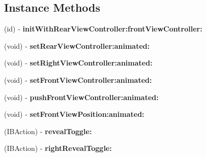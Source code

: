 \subsection*{Instance Methods}
\begin{DoxyCompactItemize}
\item 
\mbox{\label{interface_s_w_reveal_view_controller_ae4ad4764b464359b722a5fe849ba26ab}} 
(id) -\/ {\bfseries init\+With\+Rear\+View\+Controller\+:front\+View\+Controller\+:}
\item 
\mbox{\label{interface_s_w_reveal_view_controller_acd7ee8b7d9d14a478f636ff99a4b3539}} 
(void) -\/ {\bfseries set\+Rear\+View\+Controller\+:animated\+:}
\item 
\mbox{\label{interface_s_w_reveal_view_controller_a10794d3986dfc154c1298fcf3f22f27f}} 
(void) -\/ {\bfseries set\+Right\+View\+Controller\+:animated\+:}
\item 
\mbox{\label{interface_s_w_reveal_view_controller_abfd6609b6b89cf19ce7e13a8923ac970}} 
(void) -\/ {\bfseries set\+Front\+View\+Controller\+:animated\+:}
\item 
\mbox{\label{interface_s_w_reveal_view_controller_a506dd67da263a52982fcef0465ef2526}} 
(void) -\/ {\bfseries push\+Front\+View\+Controller\+:animated\+:}
\item 
\mbox{\label{interface_s_w_reveal_view_controller_a7352df159e69410e7bbef5263733a801}} 
(void) -\/ {\bfseries set\+Front\+View\+Position\+:animated\+:}
\item 
\mbox{\label{interface_s_w_reveal_view_controller_aff68ac477ff6e731a74cb6b2abcf1057}} 
(I\+B\+Action) -\/ {\bfseries reveal\+Toggle\+:}
\item 
\mbox{\label{interface_s_w_reveal_view_controller_a501ceadae86826ae6adb3ca23f49c872}} 
(I\+B\+Action) -\/ {\bfseries right\+Reveal\+Toggle\+:}
\item 
\mbox{\label{interface_s_w_reveal_view_controller_aca83b2b895be3c5f15c639e2fdb8718a}} 

\end{DoxyCompactItemize}
